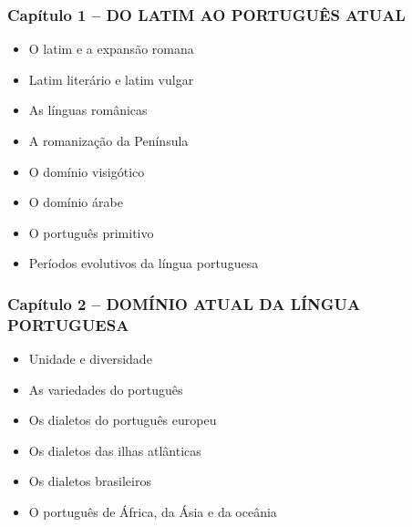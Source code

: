 \documentclass[a4paper,12pt]{article}[abntex2]
\begin{document}
\subsubsection*{Capítulo 1 – DO LATIM AO PORTUGUÊS ATUAL}
\begin{itemize}
    \item O latim e a expansão romana
    \item Latim literário e latim vulgar
    \item As línguas românicas
    \item A romanização da Península
    \item O domínio visigótico
    \item O domínio árabe
    \item O português primitivo
    \item Períodos evolutivos da língua portuguesa
\end{itemize}

\subsubsection*{Capítulo 2 – DOMÍNIO ATUAL DA LÍNGUA PORTUGUESA}
\begin{itemize}
    \item Unidade e diversidade
    \item As variedades do português
    \item Os dialetos do português europeu
    \item Os dialetos das ilhas atlânticas
    \item Os dialetos brasileiros
    \item O português de África, da Ásia e da oceânia
\end{itemize}
\end{document}
